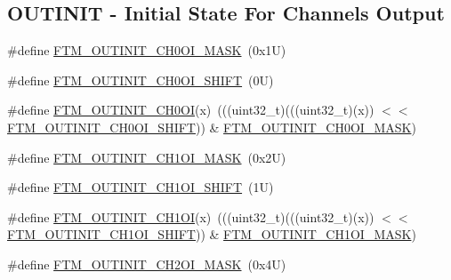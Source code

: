 \subsection*{O\+U\+T\+I\+N\+IT -\/ Initial State For Channels Output}
\begin{DoxyCompactItemize}
\item 
\#define \mbox{\hyperlink{group___f_t_m___register___masks_ga25049f81cfbb792f293e74d623d1a945}{F\+T\+M\+\_\+\+O\+U\+T\+I\+N\+I\+T\+\_\+\+C\+H0\+O\+I\+\_\+\+M\+A\+SK}}~(0x1\+U)
\item 
\#define \mbox{\hyperlink{group___f_t_m___register___masks_ga3fdff5ede58f533fe4ecc296db939b4b}{F\+T\+M\+\_\+\+O\+U\+T\+I\+N\+I\+T\+\_\+\+C\+H0\+O\+I\+\_\+\+S\+H\+I\+FT}}~(0\+U)
\item 
\#define \mbox{\hyperlink{group___f_t_m___register___masks_gaecdb7878dd9df3732ec7f58928c5305e}{F\+T\+M\+\_\+\+O\+U\+T\+I\+N\+I\+T\+\_\+\+C\+H0\+OI}}(x)~(((uint32\+\_\+t)(((uint32\+\_\+t)(x)) $<$$<$ \mbox{\hyperlink{group___f_t_m___register___masks_ga3fdff5ede58f533fe4ecc296db939b4b}{F\+T\+M\+\_\+\+O\+U\+T\+I\+N\+I\+T\+\_\+\+C\+H0\+O\+I\+\_\+\+S\+H\+I\+FT}})) \& \mbox{\hyperlink{group___f_t_m___register___masks_ga25049f81cfbb792f293e74d623d1a945}{F\+T\+M\+\_\+\+O\+U\+T\+I\+N\+I\+T\+\_\+\+C\+H0\+O\+I\+\_\+\+M\+A\+SK}})
\item 
\#define \mbox{\hyperlink{group___f_t_m___register___masks_ga36d7ebc12c5244ef6852a0327113420e}{F\+T\+M\+\_\+\+O\+U\+T\+I\+N\+I\+T\+\_\+\+C\+H1\+O\+I\+\_\+\+M\+A\+SK}}~(0x2\+U)
\item 
\#define \mbox{\hyperlink{group___f_t_m___register___masks_ga419aab88bd101c374e1f1be56d122a35}{F\+T\+M\+\_\+\+O\+U\+T\+I\+N\+I\+T\+\_\+\+C\+H1\+O\+I\+\_\+\+S\+H\+I\+FT}}~(1\+U)
\item 
\#define \mbox{\hyperlink{group___f_t_m___register___masks_gab85f577a1ac5945122bf9bca922eabcc}{F\+T\+M\+\_\+\+O\+U\+T\+I\+N\+I\+T\+\_\+\+C\+H1\+OI}}(x)~(((uint32\+\_\+t)(((uint32\+\_\+t)(x)) $<$$<$ \mbox{\hyperlink{group___f_t_m___register___masks_ga419aab88bd101c374e1f1be56d122a35}{F\+T\+M\+\_\+\+O\+U\+T\+I\+N\+I\+T\+\_\+\+C\+H1\+O\+I\+\_\+\+S\+H\+I\+FT}})) \& \mbox{\hyperlink{group___f_t_m___register___masks_ga36d7ebc12c5244ef6852a0327113420e}{F\+T\+M\+\_\+\+O\+U\+T\+I\+N\+I\+T\+\_\+\+C\+H1\+O\+I\+\_\+\+M\+A\+SK}})
\item 
\#define \mbox{\hyperlink{group___f_t_m___register___masks_ga06ffa599245bdf8bb3c19f45a11f96f4}{F\+T\+M\+\_\+\+O\+U\+T\+I\+N\+I\+T\+\_\+\+C\+H2\+O\+I\+\_\+\+M\+A\+SK}}~(0x4\+U)
\item 

\end{DoxyCompactItemize}
